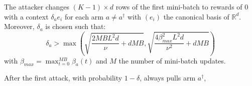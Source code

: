 The attacker changes $(K-1)\times d$ rows of the first mini-batch to rewards of $0$ with a context $\delta_a e_i$ for each arm $a \neq a^{\dagger}$ with $(e_i)$ the canonical basis of $\mathbb{R}^{d}$. Moreover, $\delta_{a}$ is chosen such that: 
\begin{equation}
    \delta_{a}  > \max\left(\sqrt{\frac{2MBL^{2}d}{\nu} + dMB},  \sqrt{\frac{4\beta_{max}^2L^{2}d}{\nu^{2}} + dMB}\right)
    \label{eq:delta_botnets}
\end{equation}
with $\beta_{max} = \max_{t=0}^{MB} \beta_a(t)$ and $M$ the number of mini-batch updates.

\begin{prop}\label{prop:attacker_can_choose}
After the first attack, with probability $1-\delta$, \linucb always pulls arm $a^{\dagger}$, 
\end{prop}

